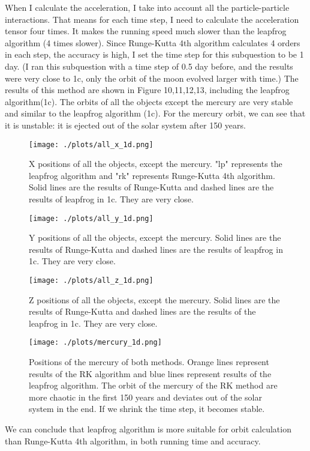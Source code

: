 When I calculate the acceleration, I take into account all the particle-particle interactions. That means for each time step, I need to calculate the acceleration tensor four times. It makes the running speed much slower than the leapfrog algorithm (4 times slower). Since Runge-Kutta 4th algorithm calculates 4 orders in each step, the accuracy is high, I set the time step for this subquestion to be 1 day. (I ran this subquestion with a time step of 0.5 day before, and the results were very close to 1c, only the orbit of the moon evolved larger with time.) The results of this method are shown in Figure 10,11,12,13, including the leapfrog algorithm(1c). The orbits of all the objects except the mercury are very stable and similar to the leapfrog algorithm (1c). For the mercury orbit, we can see that it is unstable: it is ejected out of the solar system after 150 years.
\begin{figure}[h!]
  \centering
  \texttt{[image: ./plots/all\_x\_1d.png]}
  \caption{X positions of all the objects, except the mercury. "lp" represents the leapfrog algorithm and "rk" represents Runge-Kutta 4th algorithm. Solid lines are the results of Runge-Kutta and dashed lines are the results of leapfrog in 1c. They are very close.}
  \label{fig10}
\end{figure}

\begin{figure}[h!]
  \centering
  \texttt{[image: ./plots/all\_y\_1d.png]}
  \caption{Y positions of all the objects, except the mercury. Solid lines are the results of Runge-Kutta and dashed lines are the results of leapfrog in 1c. They are very close.}
  \label{fig11}
\end{figure}

\begin{figure}[h!]
  \centering
  \texttt{[image: ./plots/all\_z\_1d.png]}
  \caption{Z positions of all the objects, except the mercury. Solid lines are the results of Runge-Kutta and dashed lines are the results of the leapfrog in 1c. They are very close.}
  \label{fig12}
\end{figure}

\begin{figure}[h!]
  \centering
  \texttt{[image: ./plots/mercury\_1d.png]}
  \caption{Positions of the mercury of both methods. Orange lines represent results of the RK algorithm and blue lines represent results of the leapfrog algorithm. The orbit of the mercury of the RK method are more chaotic in the first 150 years and deviates out of the solar system in the end. If we shrink the time step, it becomes stable.}
\end{figure}

We can conclude that leapfrog algorithm is more suitable for orbit calculation than Runge-Kutta 4th algorithm, in both running time and accuracy.
